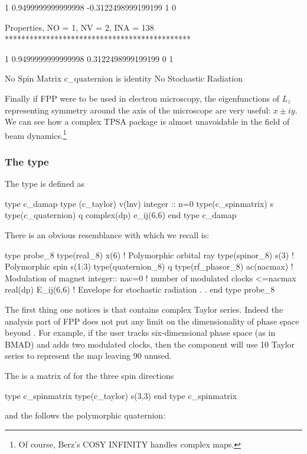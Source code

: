 \documentclass[english,12pt,article]{article} %
\begin{document}
{\begin{example}
   1  0.9499999999999998     -0.3122498999199199       1  0


 Properties, NO =    1, NV =    2, INA =  138
 *********************************************

   1  0.9499999999999998      0.3122498999199199       0  1

  No Spin Matrix
  c_quaternion is identity
 No Stochastic Radiation
\end{example}

Finally if FPP were to be used in electron microscopy, the eigenfunctions of $L_z$ representing symmetry around the axis of the microscope are very useful: $x \pm i y$. We can see how a complex TPSA package is almost unavoidable in the field of beam dynamics.\footnote{Of course, Berz's COSY INFINITY handles complex maps.}
 
  \subsubsection{The type {} }\label{sec:c_damap}
  
  The type   is defined as
  
  \begin{example}
 type c_damap
   type (c_taylor) v(lnv)  
   integer :: n=0 
   type(c_spinmatrix) s 
   type(c_quaternion) q
   complex(dp) e_ij(6,6) 
 end type c_damap
  \end{example}

There is an obvious resemblance  with  which we recall is:
  \begin{example}
    type probe_8
     type(real_8) x(6)     ! Polymorphic orbital ray
     type(spinor_8) s(3)   ! Polymorphic spin s(1:3)
     type(quaternion_8) q 
     type(rf_phasor_8)  ac(nacmax)  ! Modulation of magnet
     integer:: nac=0 !  number of modulated clocks <=nacmax
     real(dp) E_ij(6,6)   !  Envelope for stochastic radiation
           .
           .
  end type probe_8
    \end{example}

The first thing one notices is that   contains  complex Taylor series. Indeed the analysis part of FPP does not put any limit on the dimensionality of phase space beyond . For example, if the user tracks six-dimensional phase space (as in BMAD) and adds two modulated clocks, then the component    will use 10 Taylor series to represent the map leaving 90 unused. 


The  is a matrix of   for the three spin directions
  \begin{example}
  type c_spinmatrix
     type(c_taylor) s(3,3)
  end type c_spinmatrix
      \end{example}
and the  follows the polymorphic quaternion:

}
\end{document}
